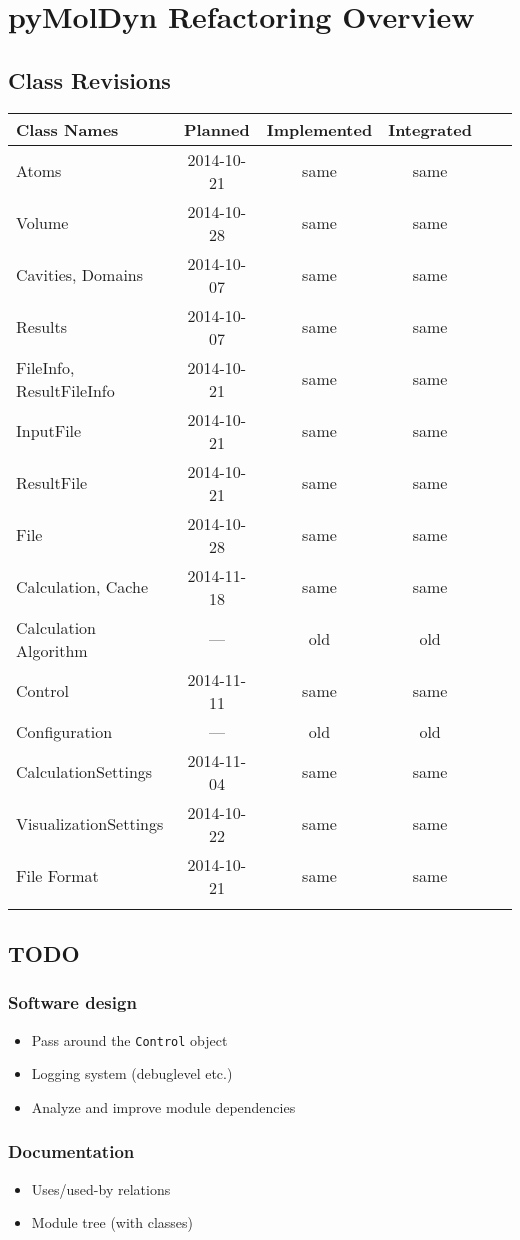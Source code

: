 \documentclass[final, oneside, a4paper, 11pt, pdftex, english]{scrreprt}
\begin{document}
\chapter*{pyMolDyn Refactoring Overview}
\section*{Class Revisions}

\begin{tabular}{|l|c|c|c|c|c|}
    \hline
    \textbf{Class Names} & \textbf{Planned} & \textbf{Implemented} & \textbf{Integrated} \\
    \hline
    Atoms & 2014-10-21 & same & same \\
    \hline
    Volume & 2014-10-28 & same & same \\
    \hline
    Cavities, Domains & 2014-10-07 & same & same \\
    \hline
    Results & 2014-10-07 & same & same \\
    \hline
    FileInfo, ResultFileInfo & 2014-10-21 & same & same \\
    \hline
    InputFile & 2014-10-21 & same & same\\
    \hline
    ResultFile & 2014-10-21 & same & same\\
    \hline
    File & 2014-10-28 & same & same\\
    \hline
    Calculation, Cache & 2014-11-18 & same & same\\
    \hline
    Calculation Algorithm & --- & old & old \\
    \hline
    Control & 2014-11-11 & same & same \\
    \hline
    Configuration & --- & old & old \\
    \hline
    CalculationSettings & 2014-11-04 & same & same \\
    \hline
    VisualizationSettings & 2014-10-22 & same & same\\
    \hline
    File Format & 2014-10-21 & same & same \\
    \hline
    & & & \\
    \hline
\end{tabular}


\section*{TODO}
\subsection*{Software design}
\begin{itemize}\itemsep0pt
    \item Pass around the \texttt{Control} object
    \item Logging system (debuglevel etc.)
    \item Analyze and improve module dependencies
\end{itemize}


\subsection*{Documentation}
\begin{itemize}\itemsep0pt
    \item Uses/used-by relations
    \item Module tree (with classes)
\end{itemize}
\end{document}
